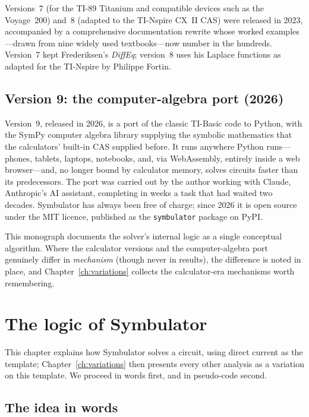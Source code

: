 \documentclass[11pt,oneside]{report}
\newcommand{\code}[1]{\texttt{#1}}
\begin{document}
Versions~7 (for the TI-89 Titanium and compatible devices such as the
Voyage~200) and~8 (adapted to the TI-Nspire CX~II CAS) were released
in 2023, accompanied by a comprehensive documentation rewrite whose
worked examples---drawn from nine widely used textbooks---now number
in the hundreds. Version~7 kept Frederiksen's \emph{DiffEq};
version~8 uses his Laplace functions as adapted for the TI-Nspire by
Philippe Fortin.

\section{Version 9: the computer-algebra port (2026)}

Version~9, released in 2026, is a port of the classic TI-Basic code to
Python, with the SymPy computer algebra library supplying the symbolic
mathematics that the calculators' built-in CAS supplied before. It
runs anywhere Python runs---phones, tablets, laptops, notebooks, and,
via WebAssembly, entirely inside a web browser---and, no longer bound
by calculator memory, solves circuits faster than its predecessors.
The port was carried out by the author working with Claude,
Anthropic's AI assistant, completing in weeks a task that had waited
two decades. Symbulator has always been free of charge; since 2026 it
is open source under the MIT licence, published as the
\code{symbulator} package on PyPI.

This monograph documents the solver's internal logic as a single
conceptual algorithm. Where the calculator versions and the
computer-algebra port genuinely differ in \emph{mechanism} (though
never in results), the difference is noted in place, and
Chapter~\ref{ch:variations} collects the calculator-era mechanisms
worth remembering.

\chapter{The logic of Symbulator}
\label{ch:logic}

This chapter explains how Symbulator solves a circuit, using direct
current as the template; Chapter~\ref{ch:variations} then presents
every other analysis as a variation on this template. We proceed in
words first, and in pseudo-code second.

\section{The idea in words}
\label{sec:idea}
\end{document}
